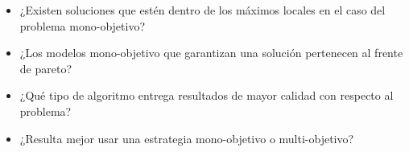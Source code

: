 \begin{itemize}

\item ¿Existen soluciones que estén dentro de los máximos locales en el caso del problema mono-objetivo?

\item ¿Los modelos mono-objetivo que garantizan una solución pertenecen al frente de pareto?

\item ¿Qué tipo de algoritmo entrega resultados de mayor calidad con respecto al problema?

\item ¿Resulta mejor usar una estrategia mono-objetivo o multi-objetivo?

\end{itemize}


